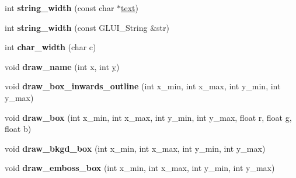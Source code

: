 \begin{DoxyCompactItemize}
\item 
\hypertarget{class_g_l_u_i___control_a57ed4e7d0b82e459fb713a9bf29db12b}{int {\bfseries string\+\_\+width} (const char $\ast$\hyperlink{class_g_l_u_i___control_af0d60e9736f4dbc34e9a536e75876d72}{text})}\label{class_g_l_u_i___control_a57ed4e7d0b82e459fb713a9bf29db12b}

\item 
\hypertarget{class_g_l_u_i___control_a9d129d259e01c1b28f4fc7a7a7830189}{int {\bfseries string\+\_\+width} (const G\+L\+U\+I\+\_\+\+String \&str)}\label{class_g_l_u_i___control_a9d129d259e01c1b28f4fc7a7a7830189}

\item 
\hypertarget{class_g_l_u_i___control_ae56ff4899b691fc25332071f8f4c15f3}{int {\bfseries char\+\_\+width} (char c)}\label{class_g_l_u_i___control_ae56ff4899b691fc25332071f8f4c15f3}

\item 
\hypertarget{class_g_l_u_i___control_aacacd563742e3e48bc5f27643e4a514c}{void {\bfseries draw\+\_\+name} (int x, int \hyperlink{_ice_utils_8h_aa7ffaed69623192258fb8679569ff9ba}{y})}\label{class_g_l_u_i___control_aacacd563742e3e48bc5f27643e4a514c}

\item 
\hypertarget{class_g_l_u_i___control_adba9e88ff56a8ea0596e6b1ede3d4b9d}{void {\bfseries draw\+\_\+box\+\_\+inwards\+\_\+outline} (int x\+\_\+min, int x\+\_\+max, int y\+\_\+min, int y\+\_\+max)}\label{class_g_l_u_i___control_adba9e88ff56a8ea0596e6b1ede3d4b9d}

\item 
\hypertarget{class_g_l_u_i___control_a5dff8194089a66651d3729cf7c465644}{void {\bfseries draw\+\_\+box} (int x\+\_\+min, int x\+\_\+max, int y\+\_\+min, int y\+\_\+max, float r, float g, float b)}\label{class_g_l_u_i___control_a5dff8194089a66651d3729cf7c465644}

\item 
\hypertarget{class_g_l_u_i___control_ad1bcdb980c0ccbcbafd7b51a6564ccc0}{void {\bfseries draw\+\_\+bkgd\+\_\+box} (int x\+\_\+min, int x\+\_\+max, int y\+\_\+min, int y\+\_\+max)}\label{class_g_l_u_i___control_ad1bcdb980c0ccbcbafd7b51a6564ccc0}

\item 
\hypertarget{class_g_l_u_i___control_a1386b942473e028e9204bd1a28e83a6d}{void {\bfseries draw\+\_\+emboss\+\_\+box} (int x\+\_\+min, int x\+\_\+max, int y\+\_\+min, int y\+\_\+max)}\label{class_g_l_u_i___control_a1386b942473e028e9204bd1a28e83a6d}


\end{DoxyCompactItemize}
